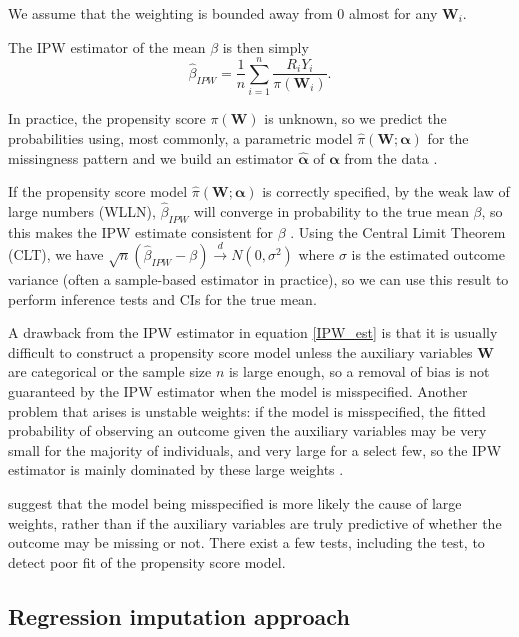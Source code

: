 \documentclass[12pt,twoside]{article}
\begin{document}
We assume that the weighting is bounded away from 0 almost for any $\mathbf{W}_i$.

The IPW estimator of the mean $\beta$ is then simply 
\begin{equation} \label{IPW_est}
    \hat{\beta}_{IPW} = \frac{1}{n} \sum_{i=1}^{n} \frac{R_iY_i}{\pi(\mathbf{W}_i)}.
\end{equation}

In practice, the propensity score $\pi(\mathbf{W})$ is unknown, so we predict the probabilities using, most commonly, a parametric model $\hat\pi(\mathbf{W}; \boldsymbol\alpha)$ for the missingness pattern and we build an estimator $\hat{\boldsymbol\alpha}$ of $\boldsymbol\alpha$ from the data \citep{vansteelandt}.

If the propensity score model $\hat\pi(\mathbf{W}; \boldsymbol\alpha)$ is correctly specified, by the weak law of large numbers (WLLN), $\hat{\beta}_{IPW}$ will converge in probability to the true mean $\beta$, so this makes the IPW estimate consistent for $\beta$ \citep{davidian}. Using the Central Limit Theorem (CLT), we have $\sqrt{n}(\hat{\beta}_{IPW}-\beta) \xrightarrow{d} N(0,\sigma^2)$ where $\sigma$ is the estimated outcome variance (often a sample-based estimator in practice), so we can use this result to perform inference tests and CIs for the true mean.

A drawback from the IPW estimator in equation \ref{IPW_est} is that it is usually difficult to construct a propensity score model unless the auxiliary variables $\mathbf{W}$ are categorical or the sample size $n$ is large enough, so a removal of bias is not guaranteed by the IPW estimator when the model is misspecified. Another problem that arises is unstable weights: if the model is misspecified, the fitted probability of observing an outcome given the auxiliary variables may be very small for the majority of individuals, and very large for a select few, so the IPW estimator is mainly dominated by these large weights \citep{seaman}.

\citet{kang} suggest that the model being misspecified is more likely the cause of large weights, rather than if the auxiliary variables are truly predictive of whether the outcome may be missing or not. There exist a few tests, including the \citet{hosmer} test, to detect poor fit of the propensity score model.\\

\subsection{Regression imputation approach} 
\end{document}
